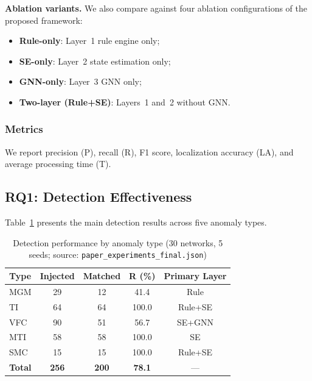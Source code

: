 \documentclass[research]{fcs}
\begin{document}
\textbf{Ablation variants.} We also compare against four ablation configurations of the proposed framework:
\begin{itemize}
\item \textbf{Rule-only}: Layer~1 rule engine only;
\item \textbf{SE-only}: Layer~2 state estimation only;
\item \textbf{GNN-only}: Layer~3 GNN only;
\item \textbf{Two-layer (Rule+SE)}: Layers~1 and~2 without GNN.
\end{itemize}

\subsubsection{Metrics}

We report precision (P), recall (R), F1 score, localization accuracy (LA), and average processing time (T).

\subsection{RQ1: Detection Effectiveness}

Table~\ref{tab:main_results} presents the main detection results across five anomaly types.

\begin{table}[htbp]
\centering
\caption{Detection performance by anomaly type (30 networks, 5 seeds; source: \texttt{paper\_experiments\_final.json})}
\label{tab:main_results}
\begin{tabular}{@{}lcccc@{}}
\toprule
Type & Injected & Matched & R (\%) & Primary Layer \\
\midrule
MGM  & 29  & 12 & 41.4 & Rule \\
TI   & 64  & 64 & 100.0 & Rule+SE \\
VFC  & 90  & 51 & 56.7 & SE+GNN \\
MTI  & 58  & 58 & 100.0 & SE \\
SMC  & 15  & 15 & 100.0 & Rule+SE \\
\midrule
\textbf{Total} & \textbf{256} & \textbf{200} & \textbf{78.1} & --- \\
\bottomrule
\end{tabular}
\end{table}
\end{document}
